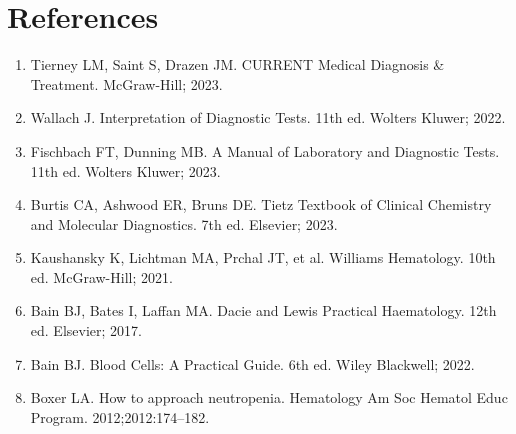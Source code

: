 \section*{References}
\begin{enumerate}
  \item Tierney LM, Saint S, Drazen JM. CURRENT Medical Diagnosis \& Treatment. McGraw-Hill; 2023.
  \item Wallach J. Interpretation of Diagnostic Tests. 11th ed. Wolters Kluwer; 2022.
  \item Fischbach FT, Dunning MB. A Manual of Laboratory and Diagnostic Tests. 11th ed. Wolters Kluwer; 2023.
  \item Burtis CA, Ashwood ER, Bruns DE. Tietz Textbook of Clinical Chemistry and Molecular Diagnostics. 7th ed. Elsevier; 2023.
  \item Kaushansky K, Lichtman MA, Prchal JT, et al. Williams Hematology. 10th ed. McGraw-Hill; 2021.
  \item Bain BJ, Bates I, Laffan MA. Dacie and Lewis Practical Haematology. 12th ed. Elsevier; 2017.
  \item Bain BJ. Blood Cells: A Practical Guide. 6th ed. Wiley Blackwell; 2022.
  \item Boxer LA. How to approach neutropenia. Hematology Am Soc Hematol Educ Program. 2012;2012:174--182.
\end{enumerate}

\clearpage
